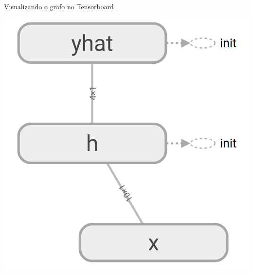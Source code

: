 \documentclass[10pt]{beamer}
\begin{document}
\begin{frame}[fragile]{Visualizando o grafo no Tensorboard}
\begin{center}
\includegraphics[scale=0.27]{images/abstract_tf_graph1.png}
\end{center}
\end{frame}
\end{document}
